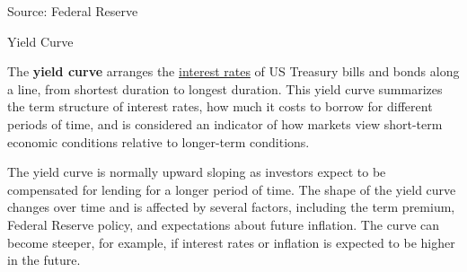 \documentclass{report}
\begin{document}
{\begin{minipage}{0.98\textwidth}
\vspace{-2mm}		
\footnotesize{Source: Federal Reserve}
\end{minipage}
\newpage
\vspace*{-11mm}

\begin{minipage}{0.76\textwidth}  
\normalsize Yield Curve
\vspace*{-1mm}

\small The \textbf{yield curve} arranges the \href{https://www.treasury.gov/resource-center/data-chart-center/interest-rates/Pages/TextView.aspx?data=yield}{interest rates} of US Treasury bills and bonds along a line, from shortest duration to longest duration. This yield curve summarizes the term structure of interest rates, how much it costs to borrow for different periods of time, and is considered an indicator of how markets view short-term economic conditions relative to longer-term conditions. 

The yield curve is normally upward sloping as investors expect to be compensated for lending for a longer period of time. The shape of the yield curve changes over time and is affected by several factors, including the term premium, Federal Reserve policy, and expectations about future inflation. The curve can become steeper, for example, if interest rates or inflation is expected to be higher in the future. 
\end{minipage}

\begin{minipage}{0.425\textwidth} 
\vspace{-2.5mm}


\end{minipage}}
\end{document}
